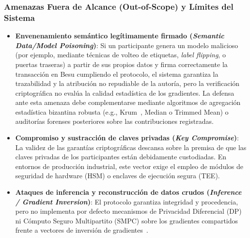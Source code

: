 \subsubsection{Amenazas Fuera de Alcance (Out-of-Scope) y Límites del Sistema}
\begin{itemize}
    \item \textbf{Envenenamiento semántico legítimamente firmado (\textit{Semantic Data/Model Poisoning})}: Si un participante genera un modelo malicioso (por ejemplo, mediante técnicas de volteo de etiquetas, \textit{label flipping}, o puertas traseras) a partir de sus propios datos y firma correctamente la transacción en Besu cumpliendo el protocolo, el sistema garantiza la trazabilidad y la atribución no repudiable de la autoría, pero la verificación criptográfica no evalúa la calidad estadística de los gradientes. La defensa ante esta amenaza debe complementarse mediante algoritmos de agregación estadística bizantina robusta (e.g., Krum~\cite{blanchard2017byzantine}, Median o Trimmed Mean) o auditorías forenses posteriores sobre las contribuciones registradas.
    \item \textbf{Compromiso y sustracción de claves privadas (\textit{Key Compromise})}: La validez de las garantías criptográficas descansa sobre la premisa de que las claves privadas de los participantes están debidamente custodiadas. En entornos de producción industrial, este vector exige el empleo de módulos de seguridad de hardware (HSM) o enclaves de ejecución segura (TEE).
    \item \textbf{Ataques de inferencia y reconstrucción de datos crudos (\textit{Inference / Gradient Inversion})}: El protocolo garantiza integridad y procedencia, pero no implementa por defecto mecanismos de Privacidad Diferencial (DP) ni Cómputo Seguro Multipartito (SMPC) sobre los gradientes compartidos frente a vectores de inversión de gradientes~\cite{carletti2026detectability}.
\end{itemize}

